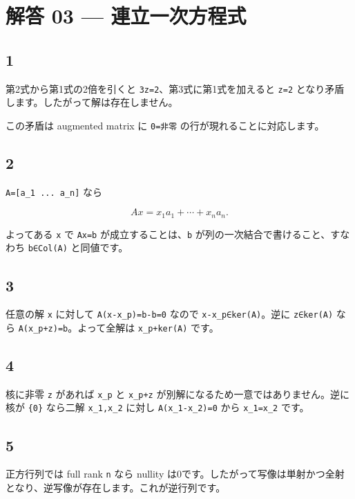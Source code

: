 \documentclass[
  11pt,
  a4paper,
]{ltjsarticle}
\author{}
\date{}
\begin{document}
\hypertarget{ux89e3ux7b54-03-ux9023ux7acbux4e00ux6b21ux65b9ux7a0bux5f0f}{%
\section{解答 03 ---
連立一次方程式}\label{ux89e3ux7b54-03-ux9023ux7acbux4e00ux6b21ux65b9ux7a0bux5f0f}}

\hypertarget{section}{%
\subsection{1}\label{section}}

第2式から第1式の2倍を引くと \texttt{3z=2}、第3式に第1式を加えると
\texttt{z=2} となり矛盾します。したがって解は存在しません。

この矛盾は augmented matrix に \texttt{0=非零}
の行が現れることに対応します。

\hypertarget{section-1}{%
\subsection{2}\label{section-1}}

\texttt{A={[}a\_1\ ...\ a\_n{]}} なら

\[
Ax=x_1a_1+\cdots+x_na_n.
\]

よってある \texttt{x} で \texttt{Ax=b} が成立することは、\texttt{b}
が列の一次結合で書けること、すなわち \texttt{b∈Col(A)} と同値です。

\hypertarget{section-2}{%
\subsection{3}\label{section-2}}

任意の解 \texttt{x} に対して \texttt{A(x-x\_p)=b-b=0} なので
\texttt{x-x\_p∈ker(A)}。逆に \texttt{z∈ker(A)} なら
\texttt{A(x\_p+z)=b}。よって全解は \texttt{x\_p+ker(A)} です。

\hypertarget{section-3}{%
\subsection{4}\label{section-3}}

核に非零 \texttt{z} があれば \texttt{x\_p} と \texttt{x\_p+z}
が別解になるため一意ではありません。逆に核が \texttt{\{0\}} なら二解
\texttt{x\_1,x\_2} に対し \texttt{A(x\_1-x\_2)=0} から
\texttt{x\_1=x\_2} です。

\hypertarget{section-4}{%
\subsection{5}\label{section-4}}

正方行列では full rank \texttt{n} なら nullity
は0です。したがって写像は単射かつ全射となり、逆写像が存在します。これが逆行列です。
\end{document}
